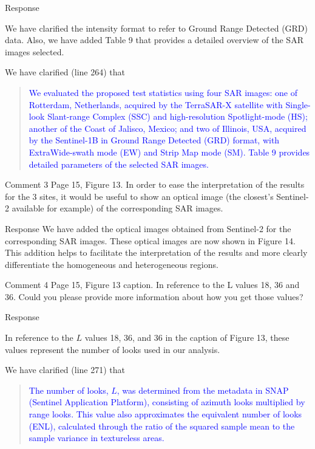 \documentclass[11pt]{report}
\begin{document}
\begin{responsebox}{Response}

We have clarified the intensity format to refer to Ground Range Detected (GRD) data. Also, we have added Table 9 that provides a detailed overview of the SAR images selected.

We have clarified (line 264) that
\begin{quote}
	\textcolor{blue}{
	We evaluated the proposed test statistics using four SAR images: one of Rotterdam, 
Netherlands, acquired by the TerraSAR-X satellite with Single-look Slant-range Complex 
(SSC) and high-resolution Spotlight-mode (HS); another of the Coast of Jalisco, Mexico; and
two of Illinois, USA, acquired by the Sentinel-1B in Ground Range Detected (GRD) format, 
with ExtraWide-swath mode (EW) and Strip Map mode (SM). Table 9 provides detailed
parameters of the selected SAR images.
}
\end{quote}

\end{responsebox}

\begin{reviewbox}{Comment 3}
Page 15, Figure 13. In order to ease the interpretation of the results for the 3 sites, it would be useful to show an optical image (the closest's Sentinel-2 available for example) of the corresponding SAR images.
\begin{responsebox}{Response}
 We have added the optical images obtained from Sentinel-2 for the corresponding SAR images. These optical images are now shown in Figure 14. This addition helps to facilitate the interpretation of the results and more clearly differentiate the homogeneous and heterogeneous regions.
\end{responsebox}
\end{reviewbox}
\begin{reviewbox}{Comment 4}
Page 15, Figure 13 caption. In reference to the L values 18, 36 and 36. Could you please provide more information about how you get those values?
\end{reviewbox}
\begin{responsebox}{Response}

In reference to the $L$ values 18, 36, and 36 in the caption of Figure 13, these values represent the number of looks used in our analysis. 

We have clarified (line 271) that
\begin{quote}
	\textcolor{blue}{
The number of looks, $L$, was determined from the metadata in SNAP (Sentinel Application Platform), consisting of azimuth looks multiplied by range looks. This value also approximates the equivalent number of looks (ENL), calculated through the ratio of the squared sample mean to the sample variance in textureless areas.
}
\end{quote}

\end{responsebox}
\end{document}
